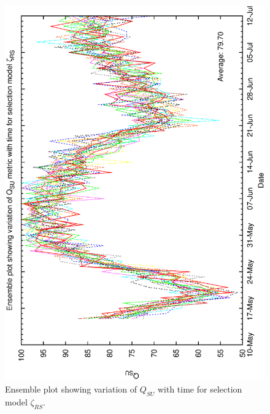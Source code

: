 \begin{figure}[h]
\begin{center}   
  \includegraphics[scale=0.5, angle=-90]{figures/biasrs_ensemble.eps}
  \caption[Ensemble plot showing variation of $Q_{SU}$ with time for selection model $\zeta_{RS}$.] 
  {Ensemble plot showing variation of $Q_{SU}$ with time for selection model $\zeta_{RS}$.}
  \label{fig:ensemble_relscorebias}   
\end{center}
\end{figure}


